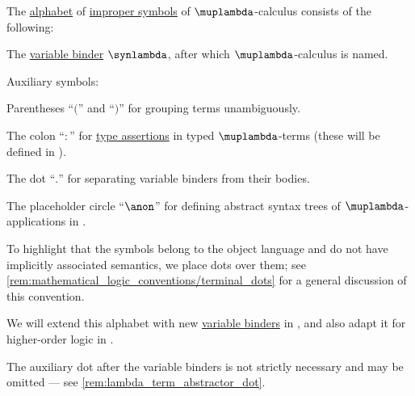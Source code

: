 \begin{definition}\label{def:lambda_term_alphabet}\mimprovised
  The \hyperref[def:formal_language/alphabet]{alphabet} of \hyperref[con:improper_symbol]{improper symbols} of \( \muplambda \)-calculus consists of the following:

  \begin{thmenum}
     The \hyperref[con:variable_binding]{variable binder} \( \synlambda \), after which \( \muplambda \)-calculus is named.

     Auxiliary symbols:
    \begin{thmenum}
       Parentheses \enquote{\( ( \)} and \enquote{\( ) \)} for grouping terms unambiguously.

       The colon \enquote{\( : \)} for \hyperref[def:type_assertion]{type assertions} in typed \( \muplambda \)-terms (these will be defined in ).

       The dot \enquote{\( . \)} for separating variable binders from their bodies.

       The placeholder circle \enquote{\( \anon \)} for defining abstract syntax trees of \( \muplambda \)-applications in .
    \end{thmenum}
  \end{thmenum}
\end{definition}
\begin{comments}
  \item To highlight that the symbols belong to the object language and do not have implicitly associated semantics, we place dots over them; see \cref{rem:mathematical_logic_conventions/terminal_dots} for a general discussion of this convention.

  \item We will extend this alphabet with new \hyperref[con:variable_binding]{variable binders} in , and also adapt it for higher-order logic in .

  \item The auxiliary dot after the variable binders is not strictly necessary and may be omitted --- see \cref{rem:lambda_term_abstractor_dot}.
\end{comments}

